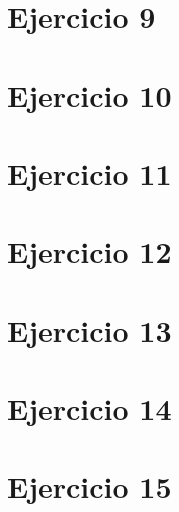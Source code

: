 \section*{Ejercicio 9}


\section*{Ejercicio 10}


\section*{Ejercicio 11}


\section*{Ejercicio 12}


\section*{Ejercicio 13}


\section*{Ejercicio 14}


\section*{Ejercicio 15}



